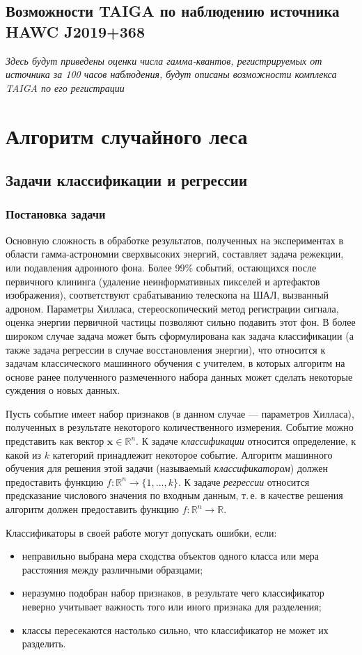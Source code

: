\documentclass[magd,floatypics,numeref]{msudipl} %
\begin{document}
\section{Возможности TAIGA по наблюдению источника HAWC J2019+368}
\textit{
Здесь будут приведены оценки числа гамма-квантов, регистрируемых от источника за 100 часов наблюдения, будут описаны возможности комплекса TAIGA по его регистрации
}
\chapter{Алгоритм случайного леса}
\section{Задачи классификации и регрессии}
\subsection{Постановка задачи}
Основную сложность в обработке результатов, полученных на экспериментах в области гамма-астрономии сверхвысоких энергий, составляет задача режекции, или подавления адронного фона. Более 99\% событий, остающихся после первичного клининга (удаление неинформативных пикселей и артефактов изображения), соответствуют срабатыванию телескопа на ШАЛ, вызванный адроном. Параметры Хилласа, стереоскопический метод регистрации сигнала, оценка энергии первичной частицы позволяют сильно подавить этот фон. В более широком случае задача может быть сформулирована как задача классификации (а также задача регрессии в случае восстановления энергии), что относится к задачам классического машинного обучения с учителем, в которых алгоритм на основе ранее полученного размеченного набора данных может сделать некоторые суждения о новых данных. 

Пусть событие имеет набор признаков (в данном случае --- параметров Хилласа), полученных в результате некоторого количественного измерения. Событие можно представить как вектор 
$\mathbf{x}\in \mathds{R}^n$. К задаче \textit{классификации} относится определение, к какой из $k$ категорий принадлежит некоторое событие. Алгоритм машинного обучения для решения этой задачи (называемый \textit{классификатором}) должен предоставить функцию $f: \mathds{R}^n \rightarrow \{ 1, \dots, k\}$. К задаче \textit{регрессии} относится предсказание числового значения по входным данным, т.\,е. в качестве решения алгоритм должен предоставить функцию $f: \mathds{R}^n \rightarrow  \mathds{R}$. 

Классификаторы в своей работе могут допускать ошибки, если:
\begin{itemize}
\item неправильно выбрана мера сходства объектов одного класса или мера расстояния между различными образцами;
\item неразумно подобран набор признаков, в результате чего классификатор неверно учитывает важность того или иного признака для разделения;
\item классы пересекаются настолько сильно, что классификатор не может их разделить.
\end{itemize}
\end{document}
